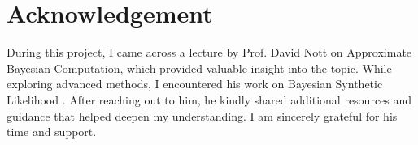 \documentclass[12pt, a4paper]{article}
\begin{document}
\section*{Acknowledgement}
\vspace{-1em} %
During this project, I came across a \href{https://youtu.be/77yECJ8_dyk?si=wJEvxuK5s3MCoifo}{lecture} by Prof. David Nott on Approximate Bayesian Computation, which provided valuable insight into the topic. While exploring advanced methods, I encountered his work on Bayesian Synthetic Likelihood \citep{Price02012018}. After reaching out to him, he kindly shared additional resources and guidance that helped deepen my understanding. I am sincerely grateful for his time and support.

%
\begingroup
\small


\endgroup
	
\end{document}
